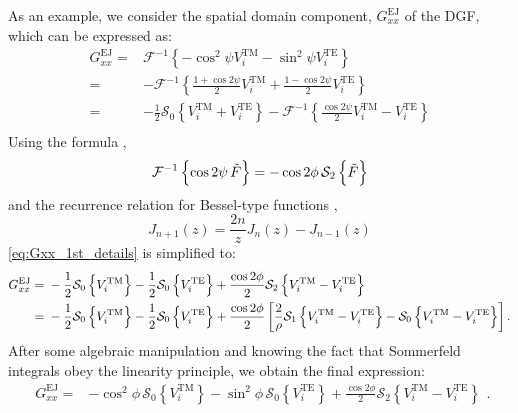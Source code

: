 \documentclass[12pt]{article}
\begin{document}
%
As an example, we consider the spatial domain component, $G_{xx}^\mathrm{EJ}$ of the DGF, which can be expressed as:
%
\begin{equation}
  \begin{split}
    G_{xx}^\mathrm{EJ} ={}& \mathcal{F}^{-1} \left \{ - \cos^2 \psi V_i^\mathrm{TM} - \sin^2 \psi V_i^\mathrm{TE} \right \} \\
    ={}& - \mathcal{F}^{-1} \left \{\frac{1 + \cos 2\psi}{2} V_i^\mathrm{TM} + \frac{1 - \cos 2\psi}{2} V_i^\mathrm{TE} \right \} \\
    ={}& - \frac{1}{2} \mathcal{S}_0 \left \{ V_i^\mathrm{TM} + V_i^\mathrm{TE} \right \} - \mathcal{F}^{-1} \left \{ \frac{\cos 2\psi}{2} V_i^\mathrm{TM} -  V_i^\mathrm{TE} \right \} \\
  \end{split}
  \label{eq:Gxx_1st_details}%
\end{equation}
%
Using the formula \cite{Michalski2005},
%
\begin{equation}
  \mathcal{F}^{-1} \left \{ \cos 2 \psi \, \tilde{F} \right \} = - \cos 2 \phi \, \mathcal{S}_2 \left \{\tilde{F} \right \}
  \label{eq:trig_property}
\end{equation}
%
and the recurrence relation for Bessel-type functions \cite{abramowitz+stegun},
%
\begin{equation}
  J_{n+1}(z) = \frac{2n}{z} J_{n}(z) - J_{n-1}(z)
  \label{eq:recurrence}
\end{equation}
%
\eqref{eq:Gxx_1st_details} is simplified to:
%
\begin{equation}
  \begin{split}
    G_{xx}^\mathrm{EJ} ={}& - \frac{1}{2} \mathcal{S}_0 \left \{ V_i^\mathrm{TM} \right \} - \frac{1}{2} \mathcal{S}_0 \left \{ V_i^\mathrm{TE} \right \} + \frac{\cos 2 \phi}{2} \mathcal{S}_2 \left \{  V_i^\mathrm{TM} -  V_i^\mathrm{TE} \right \} \\
    ={}& - \frac{1}{2} \mathcal{S}_0 \left \{ V_i^\mathrm{TM} \right \} - \frac{1}{2} \mathcal{S}_0 \left \{ V_i^\mathrm{TE} \right \} + \frac{\cos 2 \phi}{2} \left[\frac{2}{\rho} \mathcal{S}_1 \left \{  V_i^\mathrm{TM} -  V_i^\mathrm{TE}  \right \} - \mathcal{S}_0 \left \{  V_i^\mathrm{TM} -  V_i^\mathrm{TE}  \right \} \right]. \\
  \end{split}
  \label{eq:Gxx_2nd_equation}
\end{equation}
%
After some algebraic manipulation and knowing the fact that Sommerfeld integrals obey the linearity principle, we obtain the final expression:
%
\begin{equation}
  \begin{split}
    G_{xx}^\mathrm{EJ} ={}& - \cos^2 \phi \, \mathcal{S}_0 \left \{ V_i^\mathrm{TM} \right \}  - \sin^2 \phi \, \mathcal{S}_0 \left \{ V_i^\mathrm{TE} \right \} + \frac{\cos 2 \phi}{2} \mathcal{S}_2 \left \{  V_i^\mathrm{TM} -  V_i^\mathrm{TE} \right \}
  \end{split}.
  \label{eq:Gxx_final_equation}
\end{equation}
%
\end{document}
